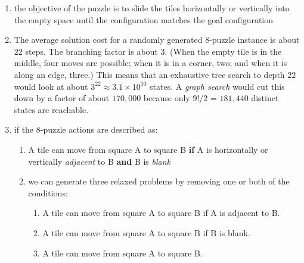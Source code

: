 \begin{enumerate}[itemsep=0.2cm]
    \item the objective of the puzzle is to slide the tiles horizontally or vertically into the empty space until the configuration matches the goal configuration
    \hfill \cite{ai/book/Artificial-Intelligence-A-Modern-Approach/Russell-Norvig}

    \item The average solution cost for a randomly generated 8-puzzle instance is about $22$ steps.
    The branching factor is about $3$. 
    (When the empty tile is in the middle, four moves are possible; when it is in a corner, two; and when it is along an edge, three.) 
    This means that an exhaustive tree search to depth $22$ would look at about $3^{22} \approx 3.1 \times 10^{10}$ states.
    A \textit{graph search} would cut this down by a factor of about $170,000$ because only $9!/2$ = $181, 440$ distinct states are reachable.
    \hfill \cite{ai/book/Artificial-Intelligence-A-Modern-Approach/Russell-Norvig}

    \item if the 8-puzzle actions are described as:
    \begin{enumerate}[itemsep=0.2cm]
        \item A tile can move from square A to square B \textbf{if} A is horizontally or vertically \textit{adjacent} to B \textbf{and} B is \textit{blank}
        \hfill \cite{ai/book/Artificial-Intelligence-A-Modern-Approach/Russell-Norvig}

        \item we can generate three relaxed problems by removing one or both of the conditions:
        \begin{enumerate}
            \item A tile can move from square A to square B if A is adjacent to B.
            \hfill \cite{ai/book/Artificial-Intelligence-A-Modern-Approach/Russell-Norvig}
            
            \item A tile can move from square A to square B if B is blank.
            \hfill \cite{ai/book/Artificial-Intelligence-A-Modern-Approach/Russell-Norvig}
            
            \item A tile can move from square A to square B.
            \hfill \cite{ai/book/Artificial-Intelligence-A-Modern-Approach/Russell-Norvig}
        \end{enumerate}
    \end{enumerate}
\end{enumerate}


